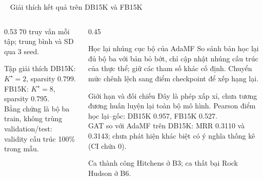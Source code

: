 \documentclass[aspectratio=169,10pt]{beamer}
\newcommand{\leveltag}[2]{%
  \tikz[baseline=(x.base)]{\node[fill=#1,text=white,inner xsep=5pt,inner ysep=1.5pt,
    rounded corners=2pt,font=\scriptsize\bfseries](x){#2};}\ %
}
\begin{document}
\begin{frame}{\leveltag{L2Orange}{CẤP ĐỘ 2} Giải thích kết quả trên DB15K và FB15K}
  \begin{columns}[c]
    \begin{column}{0.53\textwidth}
      \centering
      \resizebox{0.98\linewidth}{!}{}
      {\scriptsize\color{Slate} 70 truy vấn mỗi tập; trung bình và SD qua 3 seed.}
      \begin{block}{Tập giải thích}\footnotesize
        DB15K: $K^\star=2$, sparsity 0.799.\\
        FB15K: $K^\star=8$, sparsity 0.795.\\[0.08cm]
        Bằng chứng là bộ ba train, không trùng validation/test: validity cấu trúc 100\% trong mẫu.
      \end{block}
    \end{column}
    \begin{column}{0.45\textwidth}
      \begin{block}{Học lại nhúng cục bộ của AdaMF}\footnotesize
        So sánh bản học lại đủ bộ ba với bản bỏ bớt, chỉ cập nhật nhúng cấu trúc của thực thể; giữ các tham số khác cố định. Chuyển mức chênh lệch sang điểm checkpoint để xếp hạng lại.
      \end{block}
      \begin{alertblock}{Giới hạn và đối chiếu}\footnotesize
        Đây là phép xấp xỉ, chưa tương đương huấn luyện lại toàn bộ mô hình. Pearson điểm học lại--gốc: DB15K 0.957, FB15K 0.527.\\[0.10cm]
        GAT so với AdaMF trên DB15K: MRR 0.3110 và 0.3143; chưa phát hiện khác biệt có ý nghĩa thống kê (CI chứa 0).
      \end{alertblock}
      {\scriptsize\color{Slate} Ca thành công Hitchens ở B3; ca thất bại Rock Hudson ở B6.}
    \end{column}
  \end{columns}
\end{frame}
\end{document}
